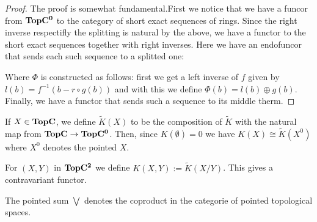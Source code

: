 \begin{proof}
	The proof is somewhat fundamental.First we notice that we have a funcor from $\operatorname{\mathbf{TopC^0}}$ to the category of short exact sequences of rings. Since the right inverse respectifly the splitting is natural by the above, we have a functor to the short exact sequences together with right inverses. Here we have an endofuncor that sends each such sequence to a splitted one:
	Where $\Phi$ is constructed as follows: 
	first we get a left inverse of $f$ given by $l(b)=f^{-1}(b-r\circ g(b))$ and with this we define $\Phi(b)=l(b)\oplus g(b)$. Finally, we have a functor that sends such a sequence to its middle therm. 
\end{proof}
\begin{cor} \label{cor: reduced Ktheory is unpointed K-theory}
	If $X\in \operatorname{\mathbf{TopC}}$, we define $\tilde{K}(X)$ to be the composition of $\tilde{K}$ with the natural map from $\operatorname{\mathbf{TopC}} \to \operatorname{\mathbf{TopC^0}}$. Then, since $K(\emptyset)=0$ we have $K(X)\cong \tilde{K}(X^0)$ where $X^0$ denotes the pointed $X$.
\end{cor}
\begin{definition}
	For $(X,Y)$ in $\operatorname{\mathbf{TopC^2}}$ we define $K(X,Y):=\tilde{K}(X/Y)$. This gives a contravariant functor. 
\end{definition}
\begin{cor}
	The pointed sum $\bigvee$ denotes the coproduct in the categorie of pointed topological spaces.
\end{cor}
